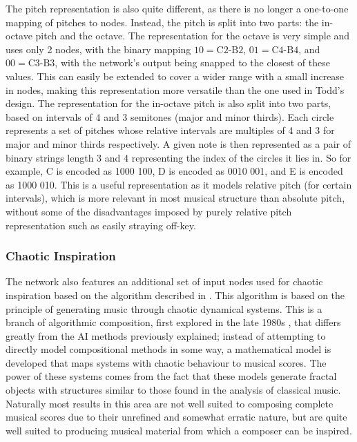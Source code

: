 \documentclass[ author={Stephen Livermore-Tozer},
				supervisor={Dr. Peter Flach},
				degree={MEng},
				title={Algorithmic Co-composition Using Machine Learning},
				subtitle={},
				type={research},
				year={2016} ]{dissertation}
\begin{document}
	The pitch representation is also quite different, as there is no longer a one-to-one mapping of pitches to nodes. Instead, the pitch is split into two parts: the in-octave pitch and the octave. The representation for the octave is very simple and uses only 2 nodes, with the binary mapping $10 = \text{C2-B2}$, $01 = \text{C4-B4}$, and $00 = \text{C3-B3}$, with the network's output being snapped to the closest of these values. This can easily be extended to cover a wider range with a small increase in nodes, making this representation more versatile than the one used in Todd's design. The representation for the in-octave pitch is also split into two parts, based on intervals of 4 and 3 semitones (major and minor thirds). Each circle represents a set of pitches whose relative intervals are multiples of 4 and 3 for major and minor thirds respectively. A given note is then represented as a pair of binary strings length 3 and 4 representing the index of the circles it lies in. So for example, C is encoded as 1000 100, D is encoded as 0010 001, and E is encoded as 1000 010. This is a useful representation as it models relative pitch (for certain intervals), which is more relevant in most musical structure than absolute pitch, without some of the disadvantages imposed by purely relative pitch representation such as easily straying off-key. 
	
	\subsubsection{Chaotic Inspiration}
	\label{sec:chaotic-inspiration}
	
	The network also features an additional set of input nodes used for chaotic inspiration based on the algorithm described in \cite{coca2010characterizing}. This algorithm is based on the principle of generating music through chaotic dynamical systems. This is a branch of algorithmic composition, first explored in the late 1980s \cite{pressing1988nonlinear}, that differs greatly from the AI methods previously explained; instead of attempting to directly model compositional methods in some way, a mathematical model is developed that maps systems with chaotic behaviour to musical scores. The power of these systems comes from the fact that these models generate fractal objects with structures similar to those found in the analysis of classical music. Naturally most results in this area are not well suited to composing complete musical scores due to their unrefined and somewhat erratic nature, but are quite well suited to producing musical material from which a composer can be inspired.
	
\end{document}
